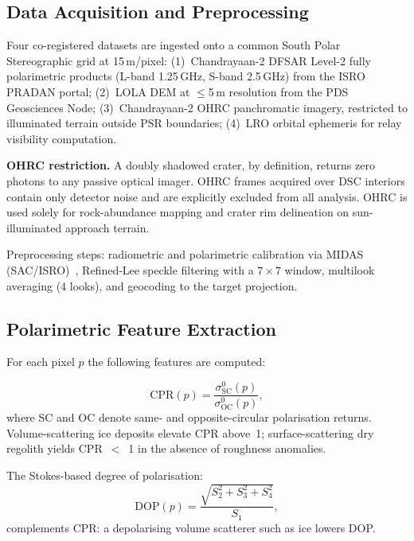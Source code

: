 \documentclass[10pt,conference]{IEEEtran}
\newcommand{\CPR}{\mathrm{CPR}}
\newcommand{\DOP}{\mathrm{DOP}}
\newcommand{\PSR}{\mathrm{PSR}}
\newcommand{\DSC}{\mathrm{DSC}}
\begin{document}
\subsection{Data Acquisition and Preprocessing}
\label{sec:method:data}

Four co-registered datasets are ingested onto a common
South Polar Stereographic grid at 15\,m/pixel:
(1)~Chandrayaan-2 DFSAR Level-2 fully polarimetric products
(L-band 1.25\,GHz, S-band 2.5\,GHz) from the ISRO PRADAN portal;
(2)~LOLA DEM at $\le$5\,m resolution from the PDS Geosciences Node;
(3)~Chandrayaan-2 OHRC panchromatic imagery, restricted to
illuminated terrain outside $\PSR$ boundaries;
(4)~LRO orbital ephemeris for relay visibility computation.

\textbf{OHRC restriction.}
A doubly shadowed crater, by definition, returns zero photons to any
passive optical imager.
OHRC frames acquired over $\DSC$ interiors contain only detector noise
and are explicitly excluded from all analysis.
OHRC is used solely for rock-abundance mapping and crater rim delineation
on sun-illuminated approach terrain.

Preprocessing steps: radiometric and polarimetric calibration via
MIDAS (SAC/ISRO)~\cite{midas2023}, Refined-Lee speckle filtering
with a $7 \times 7$ window, multilook averaging (4 looks), and
geocoding to the target projection.

\subsection{Polarimetric Feature Extraction}
\label{sec:method:features}

For each pixel $p$ the following features are computed:

\begin{equation}
\CPR(p) = \frac{\sigma^0_{\mathrm{SC}}(p)}{\sigma^0_{\mathrm{OC}}(p)},
\label{eq:cpr}
\end{equation}
where SC and OC denote same- and opposite-circular polarisation returns.
Volume-scattering ice deposits elevate CPR above~1; surface-scattering
dry regolith yields CPR~$<$~1 in the absence of roughness anomalies.

The Stokes-based degree of polarisation:
\begin{equation}
\DOP(p) = \frac{\sqrt{S_2^2 + S_3^2 + S_4^2}}{S_1},
\label{eq:dop}
\end{equation}
complements CPR: a depolarising volume scatterer such as ice lowers DOP.
\end{document}
